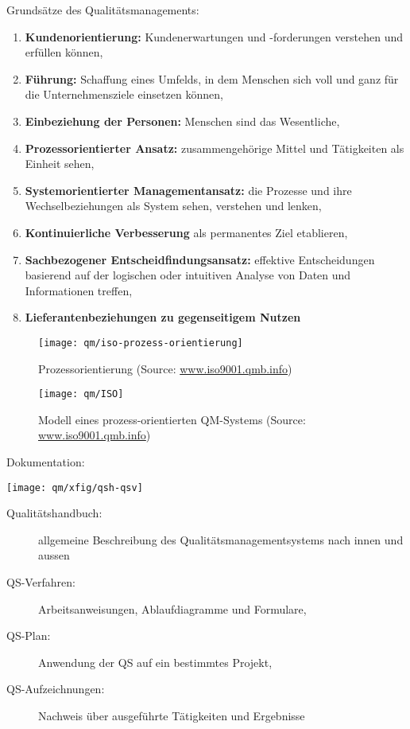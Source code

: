 \newslide
Grundsätze des Qualitätsmanagements:
\begin{enumerate}
\item {\bfseries Kundenorientierung:} Kundenerwartungen und -forderungen verstehen
  und erfüllen können,
\item {\bfseries Führung:} Schaffung eines Umfelds, in dem Menschen sich voll
 und ganz für die Unternehmensziele einsetzen können,
\item {\bfseries Einbeziehung der Personen:} Menschen sind das Wesentliche,
\item {\bfseries Prozessorientierter Ansatz:} zusammengehörige Mittel und
  Tätigkeiten als Einheit sehen,
\item {\bfseries Systemorientierter Managementansatz:} die Prozesse und ihre
  Wechselbeziehungen als System
  sehen, verstehen und lenken,
\item {\bfseries Kontinuierliche Verbesserung} als permanentes Ziel etablieren,
\item {\bfseries Sachbezogener Entscheidfindungsansatz:} effektive Entscheidungen
  basierend auf der logischen oder intuitiven Analyse von Daten und
  Informationen treffen,
\item {\bfseries Lieferantenbeziehungen zu gegenseitigem Nutzen}
\end{enumerate}
%
\begin{figure}[H]
\centering
\texttt{[image: qm/iso-prozess-orientierung]}
\ifslides
\else
\caption{Prozessorientierung
     (Source: \href{http://www.iso9001.qmb.info}{www.iso9001.qmb.info})}
\label{fig:iso-prozess-orientierung}
\fi
\end{figure}
\begin{figure}[H]
\centering
\texttt{[image: qm/ISO]}
\ifslides
\else
\caption{Modell eines prozess-orientierten QM-Systems
     (Source: \href{http://www.iso9001.qmb.info}{www.iso9001.qmb.info})}
\label{fig:iso}
\fi
\end{figure}
\ifslides
\newpage
\fi
Dokumentation: %
\begin{center}
\texttt{[image: qm/xfig/qsh-qsv]}
\end{center}
\begin{description}
\item[Qualitätshandbuch:]  allgemeine Beschreibung des
  Qualitätsmanagementsystems nach innen und aussen
\item[QS-Verfahren:] Arbeitsanweisungen, Ablaufdiagramme und Formulare,
\item[QS-Plan:] Anwendung der QS auf ein bestimmtes Projekt,
\item[QS-Aufzeichnungen:] Nachweis über ausgeführte Tätigkeiten und Ergebnisse
\end{description}
